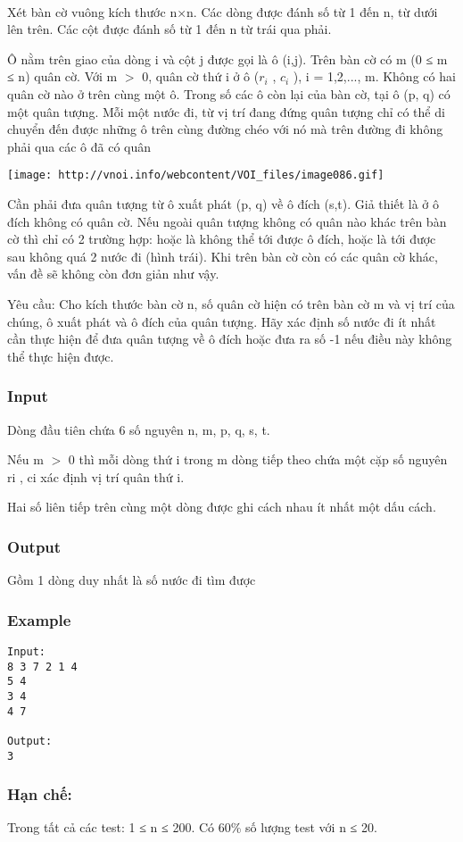 

 

Xét bàn cờ vuông kích thước n×n. Các dòng được đánh số từ 1 đến n, từ dưới lên trên. Các cột được đánh số từ 1 đến n từ trái qua phải.

Ô nằm trên giao của dòng i và cột j được gọi là ô (i,j). Trên bàn cờ có m (0 ≤ m ≤ n) quân cờ. Với m $>$ 0, quân cờ thứ i ở ô ($r_{i}$ , $c_{i}$ ), i = 1,2,..., m. Không có hai quân cờ nào ở trên cùng một ô. Trong số các ô còn lại của bàn cờ, tại ô (p, q) có một quân tượng. Mỗi một nước đi, từ vị trí đang đứng quân tượng chỉ có thể di chuyển đến được những ô trên cùng đường chéo với nó mà trên đường đi không phải qua các ô đã có quân


\texttt{[image: http://vnoi.info/webcontent/VOI\_files/image086.gif]}

Cần phải đưa quân tượng từ ô xuất phát (p, q) về ô đích (s,t). Giả thiết là ở ô đích không có quân cờ. Nếu ngoài quân tượng không có quân nào khác trên bàn cờ thì chỉ có 2 trường hợp: hoặc là không thể tới được ô đích, hoặc là tới được sau không quá 2 nước đi (hình trái). Khi trên bàn cờ còn có các quân cờ khác, vấn đề sẽ không còn đơn giản như vậy.

Yêu cầu: Cho kích thước bàn cờ n, số quân cờ hiện có trên bàn cờ m và vị trí của chúng, ô xuất phát và ô đích của quân tượng. Hãy xác định số nước đi ít nhất cần thực hiện để đưa quân tượng về ô đích hoặc đưa ra số -1 nếu điều này không thể thực hiện được.

\subsubsection{Input}

Dòng đầu tiên chứa 6 số nguyên n, m, p, q, s, t.

Nếu m $>$ 0 thì mỗi dòng thứ i trong m dòng tiếp theo chứa một cặp số nguyên ri , ci xác định vị trí quân thứ i.

Hai số liên tiếp trên cùng một dòng được ghi cách nhau ít nhất một dấu cách.

\subsubsection{Output}

Gồm 1 dòng duy nhất là số nước đi tìm được

\subsubsection{Example}
\begin{verbatim}
Input:
8 3 7 2 1 4
5 4
3 4
4 7

Output:
3
\end{verbatim}

\subsubsection{Hạn chế:}

Trong tất cả các test: 1 ≤ n ≤ 200. Có 60\% số lượng test với n ≤ 20.
